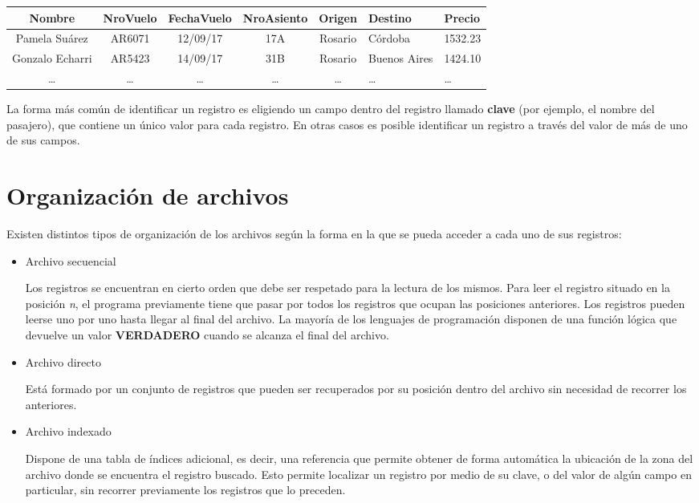 \documentclass[]{book}
\begin{document}
\begin{longtable}[]{@{}cccccll@{}}
\toprule
Nombre & NroVuelo & FechaVuelo & NroAsiento & Origen & Destino &
Precio\tabularnewline
\midrule
\endhead
Pamela Suárez & AR6071 & 12/09/17 & 17A & Rosario & Córdoba &
1532.23\tabularnewline
Gonzalo Echarri & AR5423 & 14/09/17 & 31B & Rosario & Buenos Aires &
1424.10\tabularnewline
\ldots{} & \ldots{} & \ldots{} & \ldots{} & \ldots{} & \ldots{} &
\ldots{}\tabularnewline
\bottomrule
\end{longtable}

La forma más común de identificar un registro es eligiendo un campo
dentro del registro llamado \textbf{clave} (por ejemplo, el nombre del
pasajero), que contiene un único valor para cada registro. En otras
casos es posible identificar un registro a través del valor de más de
uno de sus campos.

\section{Organización de archivos}\label{organizacion-de-archivos}

Existen distintos tipos de organización de los archivos según la forma
en la que se pueda acceder a cada uno de sus registros:

\begin{itemize}
\item
  Archivo secuencial

  Los registros se encuentran en cierto orden que debe ser respetado
  para la lectura de los mismos. Para leer el registro situado en la
  posición \emph{n}, el programa previamente tiene que pasar por todos
  los registros que ocupan las posiciones anteriores. Los registros
  pueden leerse uno por uno hasta llegar al final del archivo. La
  mayoría de los lenguajes de programación disponen de una función
  lógica que devuelve un valor \textbf{VERDADERO} cuando se alcanza el
  final del archivo.
\item
  Archivo directo

  Está formado por un conjunto de registros que pueden ser recuperados
  por su posición dentro del archivo sin necesidad de recorrer los
  anteriores.
\item
  Archivo indexado

  Dispone de una tabla de índices adicional, es decir, una referencia
  que permite obtener de forma automática la ubicación de la zona del
  archivo donde se encuentra el registro buscado. Esto permite localizar
  un registro por medio de su clave, o del valor de algún campo en
  particular, sin recorrer previamente los registros que lo preceden.
\end{itemize}
\end{document}
